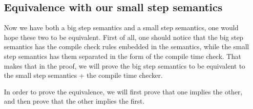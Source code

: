 \subsection{Equivalence with our small step semantics}
Now we have both a big step semantics and a small step semantics, one would hope these two to be equivalent. First of all, one should notice that the big step semantics has the compile check rules embedded in the semantics, while the small step semantics has them separated in the form of the compile time check. That makes that in the proof, we will prove the big step semantics to be equivalent to the small step semantics + the compile time checker. 

In order to prove the equivalence, we will first prove that one implies the other, and then prove that the other implies the first. 

